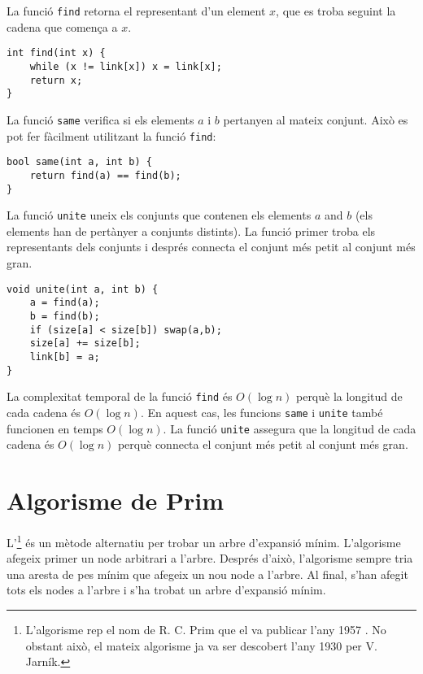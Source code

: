 La funció \texttt{find} retorna el representant d'un element $x$, que
es troba seguint la cadena que comença a $x$.


\begin{lstlisting}
int find(int x) {
    while (x != link[x]) x = link[x];
    return x;
}
\end{lstlisting}


La funció \texttt{same} verifica si els elements $a$ i $b$ pertanyen
al mateix conjunt. Això es pot fer fàcilment utilitzant la funció
\texttt{find}:


\begin{lstlisting}
bool same(int a, int b) {
    return find(a) == find(b);
}
\end{lstlisting}

La funció \texttt{unite} uneix els conjunts que contenen els elements
$a$ and $b$ (els elements han de pertànyer a conjunts distints).  La
funció primer troba els representants dels conjunts i després connecta
el conjunt més petit al conjunt més gran.
  
\begin{lstlisting}
void unite(int a, int b) {
    a = find(a);
    b = find(b);
    if (size[a] < size[b]) swap(a,b);
    size[a] += size[b];
    link[b] = a;
}
\end{lstlisting}


La complexitat temporal de la funció \texttt{find} és $O(\log n)$
perquè la longitud de cada cadena és $O(\log n)$. En aquest cas, les
funcions \texttt{same} i \texttt{unite} també funcionen en temps
$O(\log n)$. La funció \texttt{unite} assegura que la longitud de cada
cadena és $O(\log n)$ perquè connecta el conjunt més petit al conjunt
més gran.

\section{Algorisme de Prim}


L'\footnote{L'algorisme rep el nom de
R. C. Prim que el va publicar l'any 1957 \cite{pri57}. No obstant
això, el mateix algorisme ja va ser descobert l'any 1930 per
V. Jarník.} és un mètode alternatiu per trobar un arbre d'expansió
mínim. L'algorisme afegeix primer un node arbitrari a l'arbre. Després
d'això, l'algorisme sempre tria una aresta de pes mínim que afegeix un
nou node a l'arbre. Al final, s'han afegit tots els nodes a l'arbre i
s'ha trobat un arbre d'expansió mínim.

